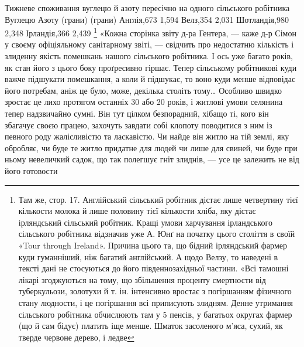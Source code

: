 Тижневе споживання вуглецю й азоту пересічно
на одного сільського робітника
                                                                                Вуглецю
             Азоту
                                                                                (грани)
               (грани)
Англія,673
     1,594
Велз,354
       2,031
Шотландія,980
   2,348
Ірландія,366
     2,439 \footnote{
Там же, стор. 17. Англійський сільський робітник дістає лише
четвертину тієї кількости молока й лише половину тієї кількости хліба,
яку дістає ірляндський сільський робітник. Кращі умови харчування
ірландського сільського робітника відзначив уже А. Юнґ на початку
цього століття в своїй «Tour through Ireland». Причина цього та, що бідний
ірляндський фармер куди гуманніший, ніж багатий англійський.
А щодо Велзу, то наведені в тексті дані не стосуються до його південнозахідньої
частини. «Всі тамошні лікарі згоджуються на тому, що збільшення
проценту смертности від туберкульози, золотухи й т. ін. інтенсивно
вростає з погіршанням фізичного стану людности, і це погіршання всі
приписують злидням. Денне утримання сільського робітника обчислюють
там у 5 пенсів, у багатьох округах фармер (що й сам бідує) платить іще
менше. Шматок засоленого м’яса, сухий, як тверде червоне дерево, і ледве
}
«Кожна сторінка звіту д-ра Гентера, — каже д-р Сімон
у своєму офіціяльному санітарному звіті, — свідчить про недостатню
кількість і злиденну якість помешкань нашого сільського
робітника. І ось уже багато років, як стан його з цього боку проґресивно
гіршає. Тепер сільському робітникові куди важче підшукати
помешкання, а коли й підшукає, то воно куди менше
відповідає його потребам, аніж це було, може, декілька століть
тому\dots{} Особливо швидко зростає це лихо протягом останніх 30
або 20 років, і житлові умови селянина тепер надзвичайно сумні.
Він тут цілком безпорадний, хібащо ті, кого він збагачує своєю
працею, захочуть завдати собі клопоту поводитися з ним із певного
роду жалісливістю та ласкавістю. Чи найде він житло на
тій землі, яку обробляє, чи буде те житло придатне для людей
чи лише для свиней, чи буде при ньому невеличкий садок, що так
полегшує гніт злиднів, — усе це залежить не від його готовости


